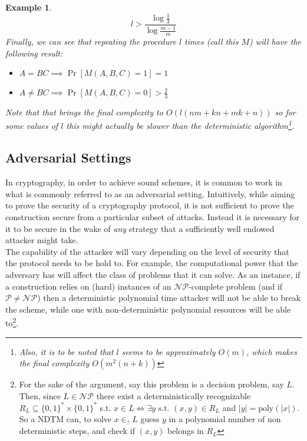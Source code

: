 \documentclass{article}
\newtheorem{example}{Example}
\begin{document}
\begin{example}
\[l > \frac{\log \frac{1}{3}}{\log \frac{m-1}{m}}\]
Finally, we can see that repeating the procedure $l$ times (call this $M$) will have the following result:
\begin{itemize}
    \item $A = BC \implies \Pr[M(A, B,C) = 1] = 1$
    \item $A \neq BC \implies \Pr[M(A, B,C) = 0] > \frac{2}{3}$
\end{itemize}

Note that that brings the final complexity to $O(l(nm + kn + mk + n))$ so for some values of $l$ this might actually be slower than the deterministic algorithm\footnote{Also, it is to be noted that $l$ seems to be approximately $O(m)$, which makes the final complexity $O(m^2(n + k))$}. 

\end{example}


\subsection{Adversarial Settings}
In cryptography, in order to achieve sound schemes, it is common to work in what is commonly referred to as an adversarial setting.
Intuitively, while aiming to prove the security of a cryptography protocol, it is not sufficient to prove the construction secure from a particular subset of attacks. Instead it is necessary for it to be secure in the wake of \textit{any} strategy that a sufficiently well endowed attacker might take. \\

The capability of the attacker will vary depending on the level of security that the protocol needs to be hold to. For example, the computational power that the adversary has will affect the class of problems that it can solve.
As an instance, if a construction relies on (hard) instances of an $\mathcal{NP}$-complete problem (and if $\mathcal{P} \neq \mathcal{NP}$) then a deterministic polynomial time attacker will not be able to break the scheme, while one with non-deterministic polynomial resources will be able to\footnote{For the sake of the argument, say this problem is a decision problem, say $L$. Then, since $L \in \mathcal{NP}$ there exist a deterministically recognizable $R_L \subseteq \{0, 1\}^* \times \{0, 1\}^* $ s.t. $x \in L \iff \exists y \text{ s.t. } (x, y) \in R_L$ and $|y| = \text{poly}(|x|)$. So a NDTM can, to solve $x \in_? L$ guess $y$ in a polynomial number of non deterministic steps, and check if $(x, y)$ belongs in $R_L$ }.
\end{document}
